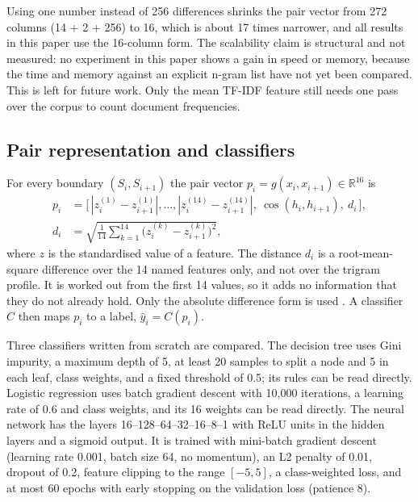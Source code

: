 \documentclass[runningheads]{llncs}
\begin{document}
Using one number instead of 256 differences shrinks the pair vector from 272 columns (14 + 2 + 256) to 16, which is about 17 times narrower, and all results in this paper use the 16-column form. The scalability claim is structural and not measured: no experiment in this paper shows a gain in speed or memory, because the time and memory against an explicit n-gram list have not yet been compared. This is left for future work. Only the mean TF-IDF feature still needs one pass over the corpus to count document frequencies.

\subsection{Pair representation and classifiers}

For every boundary $(S_i,S_{i+1})$ the pair vector $p_i = g(x_i,x_{i+1})\in\mathbb{R}^{16}$ is
\begin{equation}
\begin{split}
p_i &= \big[\,|z_i^{(1)}-z_{i+1}^{(1)}|,\ldots,|z_i^{(14)}-z_{i+1}^{(14)}|,\ \cos(h_i,h_{i+1}),\ d_i\,\big],\\
d_i &= \sqrt{\tfrac{1}{14}\textstyle\sum_{k=1}^{14}\big(z_i^{(k)}-z_{i+1}^{(k)}\big)^2},
\end{split}
\label{eq:pairvec}
\end{equation}
where $z$ is the standardised value of a feature. The distance $d_i$ is a root-mean-square difference over the 14 named features only, and not over the trigram profile. It is worked out from the first 14 values, so it adds no information that they do not already hold. Only the absolute difference form is used \cite{ramnial2015authorship,singh2021writing}. A classifier $C$ then maps $p_i$ to a label, $\hat{y}_i = C(p_i)$.

Three classifiers written from scratch are compared. The decision tree uses Gini impurity, a maximum depth of 5, at least 20 samples to split a node and 5 in each leaf, class weights, and a fixed threshold of 0.5; its rules can be read directly. Logistic regression uses batch gradient descent with 10,000 iterations, a learning rate of 0.6 and class weights, and its 16 weights can be read directly. The neural network has the layers 16--128--64--32--16--8--1 with ReLU units in the hidden layers and a sigmoid output. It is trained with mini-batch gradient descent (learning rate 0.001, batch size 64, no momentum), an L2 penalty of 0.01, dropout of 0.2, feature clipping to the range $[-5,5]$, a class-weighted loss, and at most 60 epochs with early stopping on the validation loss (patience 8).
\end{document}
